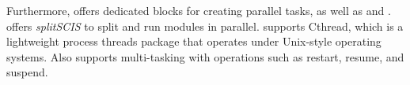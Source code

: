 Furthermore, \lego offers dedicated blocks for creating parallel tasks, %
as well as \makecode and \robotc.
\tivipe offers \textit{splitSCIS} to split and run modules in parallel. %
\missionlab supports Cthread, which is a lightweight process threads package that operates under Unix-style operating systems. Also \picaxe supports multi-tasking with operations such as restart, resume, and suspend.






